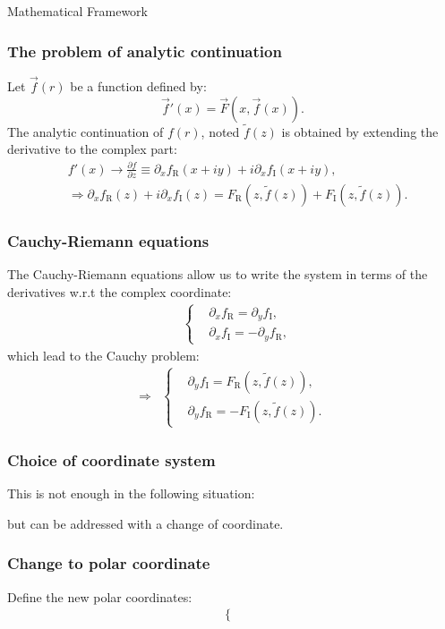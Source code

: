 \begin{section}{Mathematical Framework}
  \begin{frame}
    \frametitle{The problem of analytic continuation}
    Let $\vec f(r)$ be a function defined by:
    \begin{equation*}
      \vec f'(x) = \vec F(x, \vec f(x)).
    \end{equation*}
    The analytic continuation of $f(r)$, noted $\tilde f(z)$ is
    obtained by extending the derivative to the complex part:
    \begin{align*}
      &f'(x)\to \frac{\partial f}{\partial z}\equiv \partial_x f_{\mathrm R}(x+iy)+i\partial_x f_{\mathrm I}(x+iy),\\
      &\Rightarrow \partial_x f_{\mathrm R}(z)+i\partial_x f_{\mathrm I}(z) = F_{\mathrm R}(z,\tilde f(z))+F_{\mathrm I}(z,\tilde f(z)).
    \end{align*}
  \end{frame}
  \begin{frame}
    \frametitle{Cauchy-Riemann equations}
    The Cauchy-Riemann equations allow us to write the system in terms of the derivatives w.r.t the complex coordinate:
    \begin{align*}
      &\left\{\begin{aligned}
      &\partial_x f_{\mathrm R} = \partial_y f_{\mathrm I},\\
      &\partial_x f_{\mathrm I} = -\partial_y f_{\mathrm R},
      \end{aligned}\right.
    \end{align*}
    which lead to the Cauchy problem:
    \begin{align*}
      \Rightarrow&\left\{\begin{aligned}
      &\partial_y f_{\mathrm I} = F_{\mathrm R}(z,\tilde f(z)),\\
      &\partial_y f_{\mathrm R} = -F_{\mathrm I}(z,\tilde f(z)).
      \end{aligned}\right.
    \end{align*}
  \end{frame}
  \begin{frame}
    \frametitle{Choice of coordinate system}
    This is not enough in the following situation:
    
    but can be addressed with a change of coordinate.
  \end{frame}
  \begin{frame}
    \frametitle{Change to polar coordinate}
    Define the new polar coordinates:
    \begin{align*}
      \left\{\begin{aligned}

\end{aligned}
\end{align*}
\end{frame}
\end{section}
